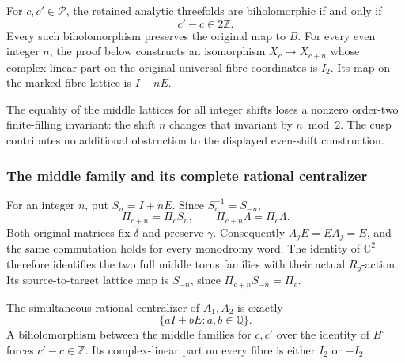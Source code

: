 \begin{theorem}
\label{pshift:thm:classification}
For $c,c'\in\mathcal P$, the retained analytic threefolds are
biholomorphic if and only if
\[
                         c'-c\in2\mathbb Z.
 \tag{PS5}\label{pshift:eq:classification}
\]
Every such biholomorphism preserves the original map to $B$. For every
even integer $n$, the proof below constructs an isomorphism
$X_c\longrightarrow X_{c+n}$ whose complex-linear part on the original
universal fibre coordinates is $I_2$. Its map on the marked fibre lattice
is $I-nE$.

The equality of the middle lattices for all integer shifts loses a
nonzero order-two finite-filling invariant: the shift $n$ changes that
invariant by $n\bmod2$. The cusp contributes no additional obstruction
to the displayed even-shift construction.
\end{theorem}

\subsubsection{The middle family and its complete rational centralizer}

For an integer $n$, put $S_n=I+nE$. Since $S_n^{-1}=S_{-n}$,
\[
 \Pi_{c+n}=\Pi_c S_n,\qquad
 \Pi_{c+n}\Lambda=\Pi_c\Lambda.
 \tag{PS6}\label{pshift:eq:integer-shear}
\]
Both original matrices fix $\widehat\delta$ and preserve $\gamma$.
Consequently $A_jE=EA_j=E$, and the same commutation holds for every
monodromy word. The identity of $\mathbb C^2$ therefore identifies
the two full middle torus families with their actual $R_g$-action.
Its source-to-target lattice map is $S_{-n}$, since
$\Pi_{c+n}S_{-n}=\Pi_c$.

\begin{lemma}
\label{pshift:lem:centralizer}
The simultaneous rational centralizer of $A_1,A_2$ is exactly
\[
 \{aI+bE:a,b\in\mathbb Q\}.
 \tag{PS7}\label{pshift:eq:centralizer}
\]
A biholomorphism between the middle families for $c,c'$ over the
identity of $B^\circ$ forces $c'-c\in\mathbb Z$. Its complex-linear
part on every fibre is either $I_2$ or $-I_2$.
\end{lemma}


